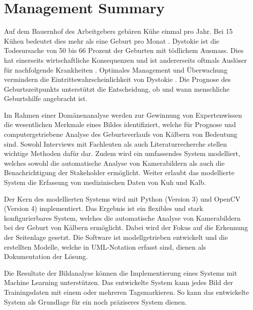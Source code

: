 

\chapter{Management Summary}

Auf dem Bauernhof des Arbeitgebers gebären Kühe einmal pro Jahr. Bei 15 Kühen bedeutet dies mehr als eine Geburt pro Monat \citep{Muller2019}. \gls{Dystokie} ist die Todesursache von 50 bis 66 Prozent der Geburten mit tödlichem Ausmass. Dies hat einerseits wirtschaftliche Konsequenzen \citep[S. 1]{Saint-Dizier2015} und ist andererseits oftmals Auslöser für nachfolgende Krankheiten \citep[S. 1]{Lange2017}.  Optimales Management und Überwachung vermindern die Eintrittswahrscheinlichkeit von Dystokie \citep[S. 1]{Lange2017}. Die Prognose des Geburtszeitpunkts unterstützt die Entscheidung, ob und wann menschliche Geburtshilfe angebracht ist. \citep[S. 1]{Saint-Dizier2015}

Im Rahmen einer Domänenanalyse werden zur Gewinnung von Expertenwissen die wesentlichen Merkmale eines Bildes  identifiziert, welche für Prognose und computergetriebene Analyse des Geburtsverlaufs von Kälbern von Bedeutung sind.
Sowohl Interviews mit Fachleuten als auch Literaturrecherche stellen wichtige Methoden dafür dar. Zudem wird ein umfassendes System modelliert, welches sowohl die automatische Analyse von Kamerabildern als auch die Benachrichtigung der Stakeholder ermöglicht. Weiter erlaubt das modellierte System die Erfassung von medizinischen Daten von Kuh und Kalb.

Der Kern des modellierten Systems wird mit Python (Version 3) und OpenCV (Version 4) implementiert. Das Ergebnis ist ein flexibles und stark konfigurierbares System, welches die automatische Analyse von Kamerabildern bei der Geburt von Kälbern ermöglicht. Dabei wird der Fokus auf die Erkennung der Seitenlage gesetzt. Die Software ist modellgetrieben entwickelt und die erstellten Modelle, welche in UML-Notation erfasst sind, dienen als Dokumentation der Lösung.

Die Resultate der Bildanalyse können die Implementierung eines Systems mit Machine Learning unterstützen. Das entwickelte System kann jedes Bild der Trainingsdaten mit einem oder mehreren \flqq Tags\frqq markieren. So kann das entwickelte System als Grundlage für ein noch präziseres System dienen.
